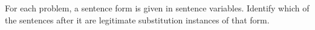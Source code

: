 \begin{exercises}
\begin{longtabu}{X[1,p,m]X[1,p,m]}
\end{longtabu}
\end{exercises}
\noindent\problempart For each problem, a sentence form is given in sentence variables. Identify which of the sentences after it are legitimate substitution instances of that form. 

